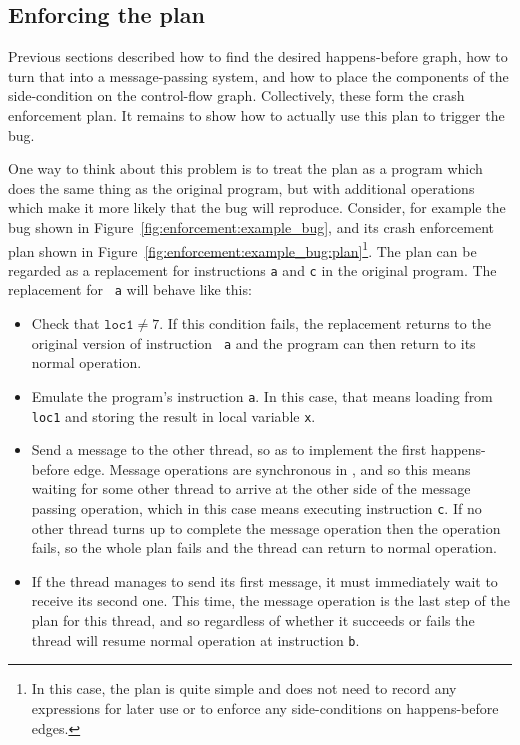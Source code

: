 
\subsection{Enforcing the plan}
\label{sect:enforce:interpreting}

Previous sections described how to find the desired happens-before
graph, how to turn that into a message-passing system, and how to
place the components of the side-condition on the control-flow graph.
Collectively, these form the crash enforcement plan.  It remains to
show how to actually use this plan to trigger the bug.

One way to think about this problem is to treat the plan as a program
which does the same thing as the original program, but with additional
operations which make it more likely that the bug will reproduce.
Consider, for example the bug shown in
Figure~\ref{fig:enforcement:example_bug}, and its crash enforcement
plan shown in
Figure~\ref{fig:enforcement:example_bug:plan}\footnote{In this case,
  the plan is quite simple and does not need to record any expressions
  for later use or to enforce any side-conditions on happens-before
  edges.}.  The plan can be regarded as a replacement for instructions
{\tt a} and {\tt c} in the original program.  The replacement for {\tt
  a} will behave like this:

\begin{itemize}
\item Check that $\mathtt{loc1} \not= 7$.  If this condition fails,
  the replacement returns to the original version of instruction {\tt
    a} and the program can then return to its normal operation.
\item Emulate the program's instruction {\tt a}.  In this case, that
  means loading from {\tt loc1} and storing the result in local
  variable {\tt x}.
\item Send a message to the other thread, so as to implement the first
  happens-before edge.  Message operations are synchronous in
  {\implementation}, and so this means waiting for some other thread
  to arrive at the other side of the message passing operation, which
  in this case means executing instruction {\tt c}.  If no other
  thread turns up to complete the message operation then the operation
  fails, so the whole plan fails and the thread can return to normal
  operation.
\item If the thread manages to send its first message, it must
  immediately wait to receive its second one.  This time, the message
  operation is the last step of the plan for this thread, and so
  regardless of whether it succeeds or fails the thread will resume
  normal operation at instruction {\tt b}.
\end{itemize}


